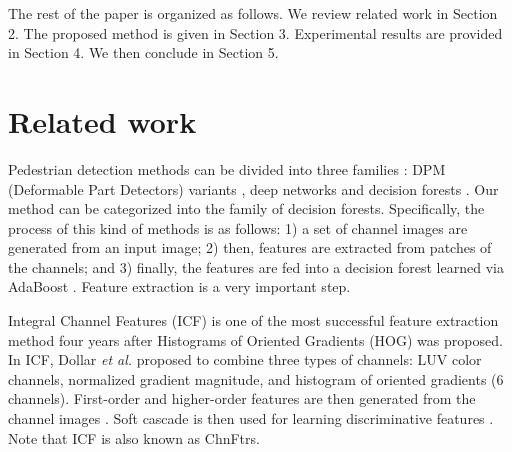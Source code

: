 \documentclass[10pt,twocolumn,letterpaper]{article}
\begin{document}
The rest of the paper is organized as follows. We review related work in 
Section 2. The proposed method is given in Section 3. Experimental 
results are provided in Section 4. We then conclude in Section 5.

\section{Related work}
Pedestrian detection methods can be divided into three families  \cite{Benenson_TenYears_ECCV_2014}: 
DPM (Deformable Part Detectors) variants \cite{Felzenszwalb_CascadeDPM_CVPR_2010,Felzenszwalb_DPM_CVPR_2008,Ouyang_SingAid_CVPR_2013},  deep networks \cite{Girshick_RCNN_CVPR_2014,Hosang_DeepLook_CVPR_2015,Sermanet_PedUMFL_CVPR_2013} and decision 
forests \cite{Appel_Pruning_ICML_2013,Dollar_ICF_BMVC_2009,Viola_RoFace_IJCV_2004}. Our method can be categorized into the family of decision forests. Specifically, the 
process of this kind of methods is as follows: 1) a set of channel images 
are generated from an input image; 2) then, features are extracted from 
patches of the channels; and 3) finally, the features are fed into a 
decision forest learned via AdaBoost \cite{Zhang_FCF_CVPR_2015}. Feature extraction is a very important step.

Integral Channel Features (ICF) \cite{Dollar_ICF_BMVC_2009} is one of the most successful feature 
extraction method four years after Histograms of Oriented Gradients 
(HOG) \cite{Dalal_HOG_CVPR_2005} was proposed. In ICF, Dollar \textit{et al.} \cite{Dollar_ICF_BMVC_2009} proposed to combine 
three types of channels: LUV color channels, normalized gradient magnitude, and histogram of 
oriented gradients (6 channels). First-order and 
higher-order features are then generated from the channel images \cite{Dollar_ICF_BMVC_2009} . Soft 
cascade \cite{Bourdev_SoftCascade_CVPR_2005,Zhang_MIP_NIPS_2008} is then used for learning 
discriminative features \cite{Dollar_ICF_BMVC_2009}. Note that ICF is also known as ChnFtrs. 
\end{document}
